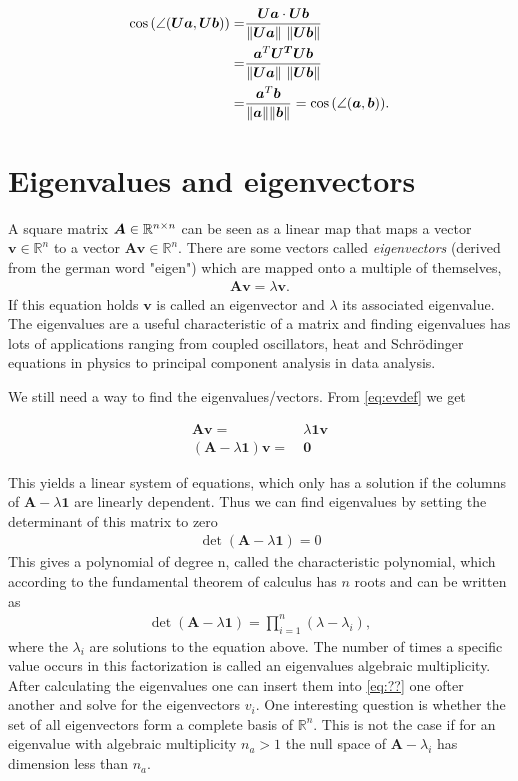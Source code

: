 \begin{align}
    \cos{(\angle(\bm{Ua}, \bm{Ub}))} =&   \frac{\bm{U}\bm{a} \cdot \bm{U} \bm{b}}{\norm{\bm{Ua}} \ \norm{\bm{Ub}} }\\
    =& \frac{\bm{a}^T \bm{U^T} \bm{U} \bm{b}}{\norm{\bm{Ua}} \ \norm{\bm{Ub}} }\\
     =& \frac{\bm{a}^T \bm{b}}{\norm{\bm{a}} \norm{\bm{b}}} = \cos{(\angle(\bm{a}, \bm{b}))}.
\end{align}
\newcommand{\R}{\mathbb{R}}
\section{Eigenvalues and eigenvectors}
A square matrix $\bm{A} \in \R^{n \x n}$ can be seen as a linear map that maps a vector $\bm{v} \in \R^n$ to a vector $\bm{Av} \in \R^n$.
There are some vectors called \emph{eigenvectors} (derived from the german word "eigen") which are mapped onto a multiple of themselves,
\begin{align}
    \bm{Av} = \lambda \bm{v}.
    \label{eq:evdef}
\end{align}
If this equation holds $\bm{v}$ is called an eigenvector and $\lambda$ its associated eigenvalue.
The eigenvalues are a useful characteristic of a matrix and finding eigenvalues has lots of applications ranging from coupled oscillators, heat and Schrödinger equations in
physics to principal component analysis in data analysis.

We still need a way to find the eigenvalues/vectors. 
From \eqref{eq:evdef} we get 

\begin{align}
    \bm{Av} =& \ \lambda \bm{1}\bm{v} \\
    (\bm{A} - \lambda \bm{1})\bm{v} =& \ \bm{0}
\end{align}

This yields a linear system of equations, which only has a solution if the columns of 
$ \bm{A}-\lambda \bm{1}$ are linearly dependent.
Thus we can find eigenvalues by setting the determinant of this matrix to zero
\begin{align}
    \det(\bm{A} - \lambda \bm{1}) = 0    
\end{align}
This gives a polynomial of degree n, called the characteristic polynomial, which according to the fundamental
theorem of calculus has $n$ roots and can be written as
\begin{align}
    \det(\bm{A} - \lambda \bm{1}) = \prod_{i=1}^n (\lambda - \lambda_i),
\end{align}
where the $\lambda_i$ are solutions to the equation above. 
The number of times a specific value occurs in this factorization is called 
an eigenvalues algebraic multiplicity.
After calculating the eigenvalues one can insert them into \eqref{eq:??} one ofter another and solve for the eigenvectors
$v_i$. One interesting question is whether the set of all eigenvectors form a complete basis of $\R^n$. 
This is not the case if for an eigenvalue with algebraic multiplicity $n_a > 1$ the null space of $\bm{A} - \lambda_i$ has dimension less than $n_a$.


